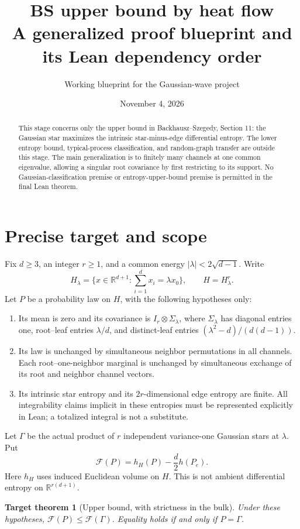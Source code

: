 \documentclass[11pt]{article}
\title{\textbf{BS upper bound by heat flow}\\[4pt]
\large A generalized proof blueprint and its Lean dependency order}
\author{Working blueprint for the Gaussian-wave project}
\date{November 4, 2026}
\newtheorem{theorem}{Target theorem}
\newcommand{\R}{\mathbb R}
\newcommand{\F}{\mathcal F}
\begin{document}
\maketitle
\begin{abstract}
This stage concerns only the upper bound in Backhausz--Szegedy, Section 11:
the Gaussian star maximizes the intrinsic star-minus-edge differential entropy.
The lower entropy bound, typical-process classification, and random-graph
transfer are outside this stage. The main generalization is to finitely many
channels at one common eigenvalue, allowing a singular root covariance by
first restricting to its support. No Gaussian-classification premise or
entropy-upper-bound premise is permitted in the final Lean theorem.
\end{abstract}

\section{Precise target and scope}
Fix $d\geq3$, an integer $r\geq1$, and a common energy
$|\lambda|<2\sqrt{d-1}$. Write
\[
 H_\lambda=\{x\in\R^{d+1}:\textstyle\sum_{i=1}^d x_i=\lambda x_0\},
 \qquad H=H_\lambda^r.
\]
Let $P$ be a probability law on $H$, with the following hypotheses only:
\begin{enumerate}
\item Its mean is zero and its covariance is $I_r\otimes\Sigma_\lambda$,
where $\Sigma_\lambda$ has diagonal entries one, root--leaf entries
$\lambda/d$, and distinct-leaf entries $(\lambda^2-d)/(d(d-1))$.
\item Its law is unchanged by simultaneous neighbor permutations in all
channels. Each root--one-neighbor marginal is unchanged by simultaneous
exchange of its root and neighbor channel vectors.
\item Its intrinsic star entropy and its $2r$-dimensional edge entropy
are finite. All integrability claims implicit in these entropies must be
represented explicitly in Lean; a totalized integral is not a substitute.
\end{enumerate}
Let $\Gamma$ be the actual product of $r$ independent variance-one
Gaussian stars at $\lambda$. Put
\[
 \F(P)=h_H(P)-\frac d2h(P_e).
\]
Here $h_H$ uses induced Euclidean volume on $H$. This is not ambient
differential entropy on $\R^{r(d+1)}$.

\begin{theorem}[Upper bound, with strictness in the bulk]
Under these hypotheses, $\F(P)\leq\F(\Gamma)$.
Equality holds if and only if $P=\Gamma$.
\end{theorem}
\end{document}
